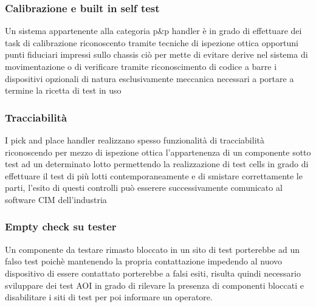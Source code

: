 \subsubsection{Calibrazione e built in self test}
Un sistema appartenente alla categoria p\&p handler è in grado di effettuare dei task di calibrazione
riconoscento tramite tecniche di ispezione ottica opportuni punti fiduciari impressi sullo chassis ciò per
mette di evitare derive nel sistema di movimentazione o di verificare tramite riconoscimento di codice a
barre i dispositivi opzionali di natura esclusivamente meccanica necessari a portare a termine la ricetta di
test in uso
\subsubsection{Tracciabilità}
I pick and place handler realizzano spesso funzionalità di tracciabilità riconoscendo per mezzo di
ispezione ottica l’appartenenza di un componente sotto test ad un determinato lotto permettendo la
realizzazione di test cells in grado di effettuare il test di più lotti contemporaneamente e di smistare
correttamente le parti, l’esito di questi controlli può esserere successivamente comunicato al software CIM
dell’industria
\subsubsection{Empty check su tester}
Un componente da testare rimasto bloccato in un sito di test porterebbe ad un falso test poichè
mantenendo la propria contattazione impedendo al nuovo dispositivo di essere contattato porterebbe a
falsi esiti, risulta quindi necessario sviluppare dei test AOI in grado di rilevare la presenza di componenti
bloccati e disabilitare i siti di test per poi informare un operatore.

\endinput